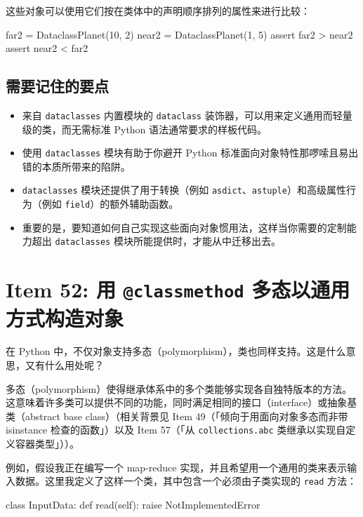 这些对象可以使用它们按在类体中的声明顺序排列的属性来进行比较：

\begin{codebox}[python]
far2 = DataclassPlanet(10, 2)
near2 = DataclassPlanet(1, 5)
assert far2 > near2
assert near2 < far2
\end{codebox}

\subsection{需要记住的要点}

\begin{itemize}
\item 来自 \texttt{dataclasses} 内置模块的 \texttt{dataclass} 装饰器，可以用来定义通用而轻量级的类，而无需标准 Python 语法通常要求的样板代码。
\item 使用 \texttt{dataclasses} 模块有助于你避开 Python 标准面向对象特性那啰嗦且易出错的本质所带来的陷阱。
\item \texttt{dataclasses} 模块还提供了用于转换（例如 \texttt{asdict}、\texttt{astuple}）和高级属性行为（例如 \texttt{field}）的额外辅助函数。
\item 重要的是，要知道如何自己实现这些面向对象惯用法，这样当你需要的定制能力超出 \texttt{dataclasses} 模块所能提供时，才能从中迁移出去。
\end{itemize}

\section{Item 52: 用 \texttt{@classmethod} 多态以通用方式构造对象}

在 Python 中，不仅对象支持多态（polymorphism），类也同样支持。这是什么意思，又有什么用处呢？

多态（polymorphism）使得继承体系中的多个类能够实现各自独特版本的方法。这意味着许多类可以提供不同的功能，同时满足相同的接口（interface）或抽象基类（abstract base class）（相关背景见 Item 49（「倾向于用面向对象多态而非带 isinstance 检查的函数」）以及 Item 57（「从 \texttt{collections.abc} 类继承以实现自定义容器类型」））。

例如，假设我正在编写一个 map-reduce 实现，并且希望用一个通用的类来表示输入数据。这里我定义了这样一个类，其中包含一个必须由子类实现的 \texttt{read} 方法：

\begin{codebox}[python]
class InputData:
    def read(self):
        raise NotImplementedError
\end{codebox}

